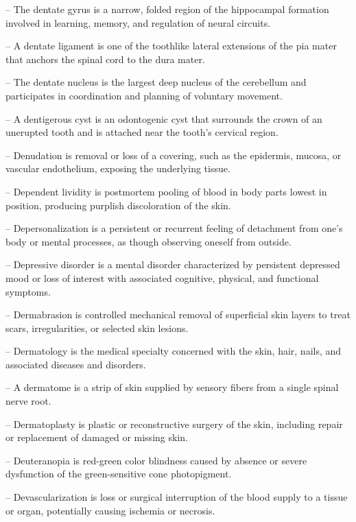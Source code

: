 -- The dentate gyrus is a narrow, folded region of the hippocampal formation involved in learning, memory, and regulation of neural circuits.

-- A dentate ligament is one of the toothlike lateral extensions of the pia mater that anchors the spinal cord to the dura mater.

-- The dentate nucleus is the largest deep nucleus of the cerebellum and participates in coordination and planning of voluntary movement.

-- A dentigerous cyst is an odontogenic cyst that surrounds the crown of an unerupted tooth and is attached near the tooth's cervical region.

-- Denudation is removal or loss of a covering, such as the epidermis, mucosa, or vascular endothelium, exposing the underlying tissue.

-- Dependent lividity is postmortem pooling of blood in body parts lowest in position, producing purplish discoloration of the skin.

-- Depersonalization is a persistent or recurrent feeling of detachment from one's body or mental processes, as though observing oneself from outside.

-- Depressive disorder is a mental disorder characterized by persistent depressed mood or loss of interest with associated cognitive, physical, and functional symptoms.

-- Dermabrasion is controlled mechanical removal of superficial skin layers to treat scars, irregularities, or selected skin lesions.

-- Dermatology is the medical specialty concerned with the skin, hair, nails, and associated diseases and disorders.

-- A dermatome is a strip of skin supplied by sensory fibers from a single spinal nerve root.

-- Dermatoplasty is plastic or reconstructive surgery of the skin, including repair or replacement of damaged or missing skin.

-- Deuteranopia is red-green color blindness caused by absence or severe dysfunction of the green-sensitive cone photopigment.

-- Devascularization is loss or surgical interruption of the blood supply to a tissue or organ, potentially causing ischemia or necrosis.

